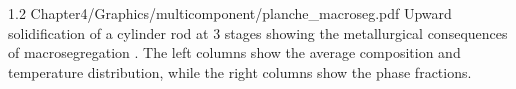 \begin{landscape}
\begin{figureth}
{1.2}
{Chapter4/Graphics/multicomponent/planche_macroseg.pdf}
{Upward solidification of a cylinder rod  at 3 stages showing the metallurgical consequences 
of macrosegregation . The left columns show the average 
composition and temperature distribution, while the right columns show the phase fractions.}
\label{fig:planche_withmacroseg}
\end{figureth}
\end{landscape}


